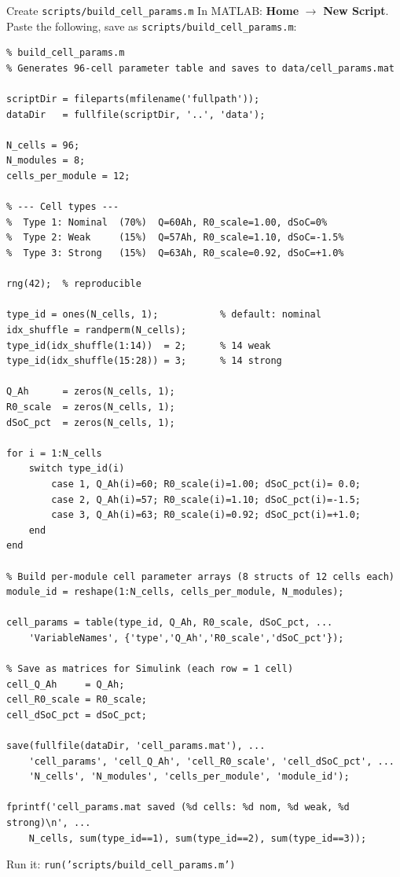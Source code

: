 \documentclass[11pt,a4paper]{article}
\begin{document}
\begin{scriptbox}{Create \texttt{scripts/build\_cell\_params.m}}
In MATLAB: \textbf{Home} $\to$ \textbf{New Script}. Paste the following, save as \texttt{scripts/build\_cell\_params.m}:

\begin{verbatim}
% build_cell_params.m
% Generates 96-cell parameter table and saves to data/cell_params.mat

scriptDir = fileparts(mfilename('fullpath'));
dataDir   = fullfile(scriptDir, '..', 'data');

N_cells = 96;
N_modules = 8;
cells_per_module = 12;

% --- Cell types ---
%  Type 1: Nominal  (70%)  Q=60Ah, R0_scale=1.00, dSoC=0%
%  Type 2: Weak     (15%)  Q=57Ah, R0_scale=1.10, dSoC=-1.5%
%  Type 3: Strong   (15%)  Q=63Ah, R0_scale=0.92, dSoC=+1.0%

rng(42);  % reproducible

type_id = ones(N_cells, 1);           % default: nominal
idx_shuffle = randperm(N_cells);
type_id(idx_shuffle(1:14))  = 2;      % 14 weak
type_id(idx_shuffle(15:28)) = 3;      % 14 strong

Q_Ah      = zeros(N_cells, 1);
R0_scale  = zeros(N_cells, 1);
dSoC_pct  = zeros(N_cells, 1);

for i = 1:N_cells
    switch type_id(i)
        case 1, Q_Ah(i)=60; R0_scale(i)=1.00; dSoC_pct(i)= 0.0;
        case 2, Q_Ah(i)=57; R0_scale(i)=1.10; dSoC_pct(i)=-1.5;
        case 3, Q_Ah(i)=63; R0_scale(i)=0.92; dSoC_pct(i)=+1.0;
    end
end

% Build per-module cell parameter arrays (8 structs of 12 cells each)
module_id = reshape(1:N_cells, cells_per_module, N_modules);

cell_params = table(type_id, Q_Ah, R0_scale, dSoC_pct, ...
    'VariableNames', {'type','Q_Ah','R0_scale','dSoC_pct'});

% Save as matrices for Simulink (each row = 1 cell)
cell_Q_Ah     = Q_Ah;
cell_R0_scale = R0_scale;
cell_dSoC_pct = dSoC_pct;

save(fullfile(dataDir, 'cell_params.mat'), ...
    'cell_params', 'cell_Q_Ah', 'cell_R0_scale', 'cell_dSoC_pct', ...
    'N_cells', 'N_modules', 'cells_per_module', 'module_id');

fprintf('cell_params.mat saved (%d cells: %d nom, %d weak, %d strong)\n', ...
    N_cells, sum(type_id==1), sum(type_id==2), sum(type_id==3));
\end{verbatim}
Run it: \texttt{run('scripts/build\_cell\_params.m')}
\end{scriptbox}
\end{document}
